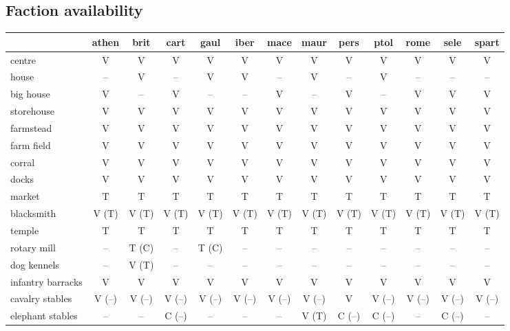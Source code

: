 \documentclass{article}
\begin{document}
\subsection{Faction availability}
\begin{tabular}{l|cccc|cccc|cccc}
 & athen & brit & cart & gaul & iber & mace & maur & pers & ptol & rome & sele & spart \\
\hline %
centre            & V & V & V & V & V & V & V & V & V & V & V & V \\
house             & -- & V & -- & V & V & -- & V & -- & V & -- & -- & -- \\
big house         & V & -- & V & -- & -- & V & -- & V & -- & V & V & V \\
storehouse        & V & V & V & V & V & V & V & V & V & V & V & V \\
farmstead         & V & V & V & V & V & V & V & V & V & V & V & V \\
farm field        & V & V & V & V & V & V & V & V & V & V & V & V \\
corral            & V & V & V & V & V & V & V & V & V & V & V & V \\
docks             & V & V & V & V & V & V & V & V & V & V & V & V \\
market            & T & T & T & T & T & T & T & T & T & T & T & T \\
blacksmith        & V (T) & V (T) & V (T) & V (T) & V (T) & V (T) & V (T) & V (T) & V (T) & V (T) & V (T) & V (T) \\
temple            & T & T & T & T & T & T & T & T & T & T & T & T \\
rotary mill       & -- & T (C) & -- & T (C) & -- & -- & -- & -- & -- & -- & -- & -- \\
\hline %
dog kennels       & -- & V (T) & -- & -- & -- & -- & -- & -- & -- & -- & -- & -- \\
infantry barracks & V & V & V & V & V & V & V & V & V & V & V & V \\
cavalry stables   & V (--) & V (--) & V (--) & V (--) & V (--) & V (--) & V (--) & V  & V (--) & V (--) & V (--) & V (--) \\
elephant stables  & -- & -- & C (--) & -- & -- & -- & V (T) & C (--) & C (--) & -- & C (--) & -- \\

\end{tabular}
\end{document}
